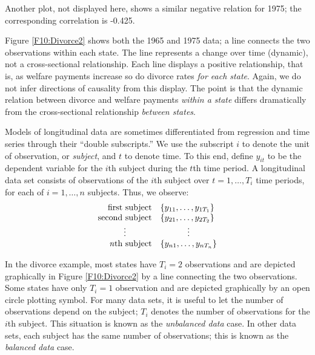Another plot, not displayed here, shows a similar negative relation
for 1975; the corresponding correlation is -0.425.

Figure \ref{F10:Divorce2} shows both the 1965 and 1975 data; a line
connects the two observations within each state. The line represents
a change over time (dynamic), not a cross-sectional relationship.
Each line displays a positive relationship, that is, as welfare
payments increase so do divorce rates \emph{for each state}. Again,
we do not infer directions of causality from this display. The point
is that the dynamic relation between divorce and welfare payments
\emph{within a state} differs dramatically from the cross-sectional
relationship \emph{between states}.

\linejed

Models of longitudinal data are sometimes differentiated from
regression and time series through their ``double subscripts.'' We
use the subscript $i$ to denote the unit of observation, or
\emph{subject}, and $t$ to denote time. To this end, define $y_{it}$
to be the dependent variable for the $i$th subject during the $t$th
time period. A longitudinal data set consists of observations of the
$i$th subject over $t=1, \ldots, T_i$ time periods, for each of
$i=1, \ldots, n$ subjects. Thus, we observe:
\begin{equation*}
\begin{array}{rl}
    \textrm{first subject} & \{y_{11}, \ldots,  y_{1T_1} \} \\
   \textrm{second subject} & \{y_{21}, \ldots,  y_{2T_2} \} \\
           \multicolumn{1}{c}{\vdots} & \multicolumn{1}{c}{\vdots}  \\
   \textrm{\textit{n}th subject} & \{y_{n1}, \ldots,  y_{nT_n} \} \\
\end{array}
\end{equation*}

In the divorce example, most states have $T_i=2$ observations and
are depicted graphically in Figure \ref{F10:Divorce2} by a line
connecting the two observations. Some states have only $T_i=1$
observation and are depicted graphically by an open circle plotting
symbol. For many data sets, it is useful to let the number of
observations depend on the subject; $T_i$ denotes the number of
observations for the $i$th subject. This situation is known as the
\textit{unbalanced data} case. In other data sets, each subject has
the same number of observations; this is known as the
\textit{balanced data} case.

